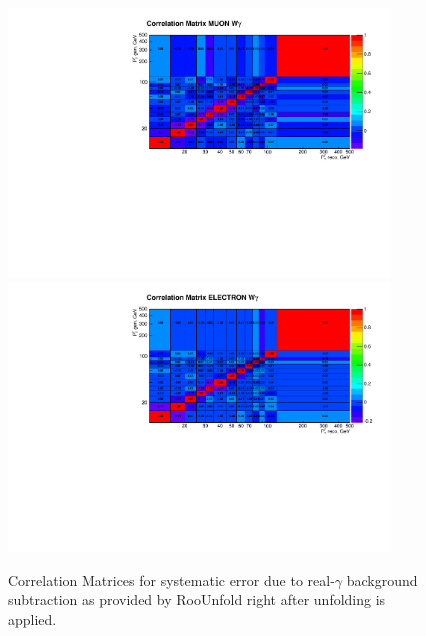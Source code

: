 \begin{figure}[htb]
  \begin{center}
   \includegraphics[width=0.90\textwidth]{../figs/figs_v11/MUON_WGamma/Constants/matrCorrelation_syst_real_g_bkg_subtr.pdf}\\
\includegraphics[width=0.90\textwidth]{../figs/figs_v11/ELECTRON_WGamma/Constants/matrCorrelation_syst_real_g_bkg_subtr.pdf}
  \caption{Correlation Matrices for systematic error due to real-$\gamma$ background subtraction as provided by RooUnfold right after unfolding is applied.}
  \label{fig:corrMatrices_syst_real_g_bkg_subtr_Wg}
  \end{center}
\end{figure}

